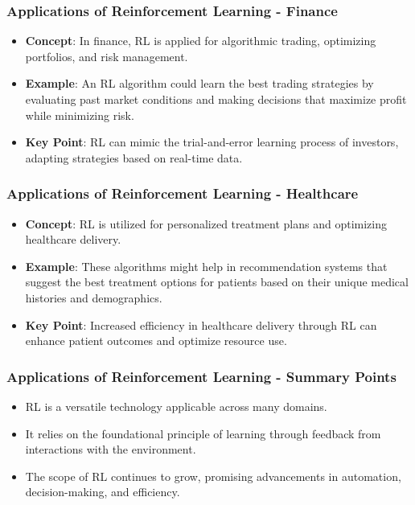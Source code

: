 \documentclass[aspectratio=169]{beamer}
\begin{document}
\begin{frame}[fragile]
    \frametitle{Applications of Reinforcement Learning - Finance}

    \begin{itemize}
        \item \textbf{Concept}: 
        In finance, RL is applied for algorithmic trading, optimizing portfolios, and risk management.
        
        \item \textbf{Example}: 
        An RL algorithm could learn the best trading strategies by evaluating past market conditions and making decisions that maximize profit while minimizing risk.
        
        \item \textbf{Key Point}: 
        RL can mimic the trial-and-error learning process of investors, adapting strategies based on real-time data.
    \end{itemize}
\end{frame}

\begin{frame}[fragile]
    \frametitle{Applications of Reinforcement Learning - Healthcare}

    \begin{itemize}
        \item \textbf{Concept}: 
        RL is utilized for personalized treatment plans and optimizing healthcare delivery.
        
        \item \textbf{Example}: 
        These algorithms might help in recommendation systems that suggest the best treatment options for patients based on their unique medical histories and demographics.
        
        \item \textbf{Key Point}: 
        Increased efficiency in healthcare delivery through RL can enhance patient outcomes and optimize resource use.
    \end{itemize}
\end{frame}

\begin{frame}[fragile]
    \frametitle{Applications of Reinforcement Learning - Summary Points}

    \begin{itemize}
        \item RL is a versatile technology applicable across many domains.
        \item It relies on the foundational principle of learning through feedback from interactions with the environment.
        \item The scope of RL continues to grow, promising advancements in automation, decision-making, and efficiency.
    \end{itemize}
\end{frame}
\end{document}
